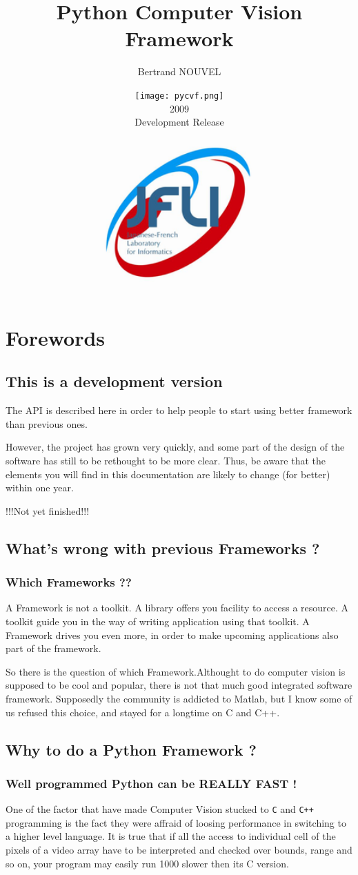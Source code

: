 \documentclass{report}
\title{Python Computer Vision Framework}
\author{Bertrand NOUVEL}
\date{\texttt{[image: pycvf.png]}\\2009\\ Development Release\\ \vspace{2cm} \\\includegraphics[width=6cm]{logo_jfli.png}}
\begin{document}
\maketitle
\tableofcontents

\chapter{Forewords}
\section{This is a development version}
The API is described here in order to help people to start using better framework than previous ones.

However, the project has grown very quickly, and some part of the design of the software has still to be rethought to be more clear.
Thus, be aware that the elements you will find in this documentation are likely to change (for better) within one year.






!!!Not yet finished!!!




\section{What's wrong with previous Frameworks ?}
\subsection{Which Frameworks ??}
A Framework is not a toolkit. A library offers you facility to access a resource. A toolkit guide you in the way
of writing application using that toolkit. A Framework drives you even more, in order to make upcoming applications also part of 
the framework.

So there is the question of which Framework.Althought to do computer vision
is supposed to be cool and popular, there is not that much good integrated software framework.
Supposedly the community is addicted to Matlab, but I know some of us refused this choice,
and stayed for a longtime on C and C++.





\section{Why to do a Python Framework ?}
\subsection{Well programmed Python can be REALLY FAST !}
One of the factor that have made Computer Vision stucked to {\tt C} and {\tt C++} programming is the fact they were affraid of loosing performance in switching to a higher level language.
It is true that if all the access to individual cell of the pixels of a video array have to be interpreted and checked over bounds, range and so on, your program may easily run 1000 slower 
then its C version.
\end{document}
